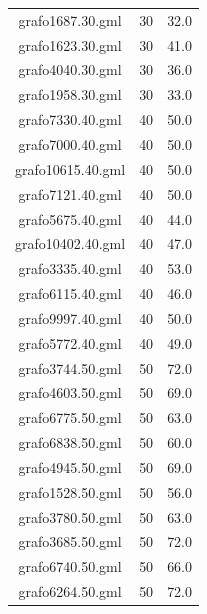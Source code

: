 \documentclass[bachelor, english]{algothesis}
\begin{document}
\begin{minipage}{0.5\textwidth}
\tablefirsthead{}
\begin{xtabular}{|c|c|c|}
grafo1687.30.gml & 30 & 32.0 \\
grafo1623.30.gml & 30 & 41.0 \\
grafo4040.30.gml & 30 & 36.0 \\
grafo1958.30.gml & 30 & 33.0 \\
\hline
grafo7330.40.gml & 40 & 50.0 \\
grafo7000.40.gml & 40 & 50.0 \\
grafo10615.40.gml & 40 & 50.0 \\
grafo7121.40.gml & 40 & 50.0 \\
grafo5675.40.gml & 40 & 44.0 \\
grafo10402.40.gml & 40 & 47.0 \\
grafo3335.40.gml & 40 & 53.0 \\
grafo6115.40.gml & 40 & 46.0 \\
grafo9997.40.gml & 40 & 50.0 \\
grafo5772.40.gml & 40 & 49.0 \\
\hline
grafo3744.50.gml & 50 & 72.0 \\
grafo4603.50.gml & 50 & 69.0 \\
grafo6775.50.gml & 50 & 63.0 \\
grafo6838.50.gml & 50 & 60.0 \\
grafo4945.50.gml & 50 & 69.0 \\
grafo1528.50.gml & 50 & 56.0 \\
grafo3780.50.gml & 50 & 63.0 \\
grafo3685.50.gml & 50 & 72.0 \\
grafo6740.50.gml & 50 & 66.0 \\
grafo6264.50.gml & 50 & 72.0 \\
\hline
\end{xtabular}
\end{minipage}%
\end{document}
